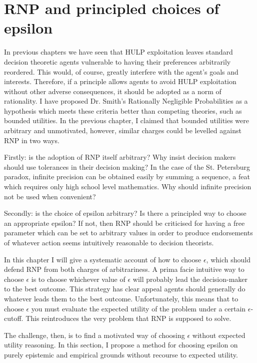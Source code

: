 \documentclass{article}
\begin{document}
\newpage\section{RNP and principled choices of epsilon}

In previous chapters we have seen that HULP exploitation leaves standard decision theoretic agents vulnerable to having their preferences arbitrarily reordered. This would, of course, greatly interfere with the agent's goals and interests. Therefore, if a principle allows agents to avoid HULP exploitation without other adverse consequences, it should be adopted as a norm of rationality. I have proposed Dr. Smith's Rationally Negligible Probabilities as a hypothesis which meets these criteria better than competing theories, such as bounded utilities. In the previous chapter, I claimed that bounded utilities were arbitrary and unmotivated, however, similar charges could be levelled against RNP in two ways.

Firstly: is the adoption of RNP itself arbitrary? Why insist decision makers should use tolerances in their decision making? In the case of the St. Petersburg paradox, infinite precision can be obtained easily by summing a sequence, a feat which requires only high school level mathematics. Why should infinite precision not be used when convenient?

Secondly: is the choice of epsilon arbitrary? Is there a principled way to choose an appropriate epsilon? If not, then RNP should be criticised for having a free parameter which can be set to arbitrary values in order to produce endorsements of whatever action seems intuitively reasonable to decision theorists. 

In this chapter I will give a systematic account of how to choose \(\epsilon\), which should defend RNP from both charges of arbitrariness. A prima facie intuitive way to choose \(\epsilon\) is to choose whichever value of \(\epsilon\) will probably lead the decision-maker to the best outcome. This strategy has clear appeal \textemdash{} agents should generally do whatever leads them to the best outcome. Unfortunately, this means that to choose \(\epsilon\) you must evaluate the expected utility of the problem under a certain \(\epsilon\)-cutoff. This reintroduces the very problem that RNP is supposed to solve. 

The challenge, then, is to find a motivated way of choosing \(\epsilon\) without expected utility reasoning. In this section, I propose a method for choosing epsilon on purely epistemic and empirical grounds without recourse to expected utility. 
\end{document}
